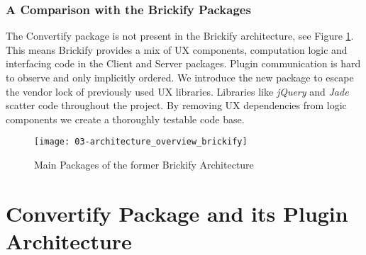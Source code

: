 \documentclass[../ClassicThesis.tex]{subfiles}
\begin{document}

\subsubsection{A Comparison with the Brickify Packages}

The Convertify package is not present in the Brickify architecture, see Figure
\ref{fig:architecture_overview_brickify}. This means Brickify provides a mix of
UX components, computation logic and interfacing code in the Client and Server
packages. Plugin communication is hard to observe and only implicitly ordered.
We introduce the new package to escape the vendor lock of previously used UX libraries. Libraries like 
\emph{jQuery} and \emph{Jade}  scatter code throughout the
project. By removing UX dependencies from logic components we create a
thoroughly testable code base.

\begin{figure}
  \texttt{[image: 03-architecture\_overview\_brickify]}
  \caption{Main Packages of the former Brickify Architecture}
  \label{fig:architecture_overview_brickify}
\end{figure}


\section{Convertify Package and its Plugin Architecture}
\end{document}
